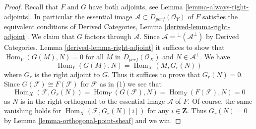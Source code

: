 \documentclass{stacks-project}
\theoremstyle{plain}
\theoremstyle{definition}
\theoremstyle{remark}
\numberwithin{equation}{subsection}
\def\Hom{\mathop{\mathrm{Hom}}\nolimits}
\begin{document}
\begin{proof}
Recall that $F$ and $G$ have both adjoints, see
Lemma \ref{lemma-always-right-adjoints}. In particular
the essential image $\mathcal{A} \subset D_{perf}(\mathcal{O}_Y)$ of $F$
satisfies the equivalent conditions of
Derived Categories, Lemma \ref{derived-lemma-right-adjoint}.
We claim that $G$ factors through $\mathcal{A}$.
Since $\mathcal{A} = {}^\perp(\mathcal{A}^\perp)$ by
Derived Categories, Lemma \ref{derived-lemma-right-adjoint}
it suffices to show that $\Hom_Y(G(M), N) = 0$ for
all $M$ in $D_{perf}(\mathcal{O}_X)$ and $N \in \mathcal{A}^\perp$.
We have
$$
\Hom_Y(G(M), N) = \Hom_X(M, G_r(N))
$$
where $G_r$ is the right adjoint to $G$. Thus it suffices to prove
that $G_r(N) = 0$. Since
$G(\mathcal{F}) \cong F(\mathcal{F})$ for $\mathcal{F}$ as in (1)
we see that
$$
\Hom_X(\mathcal{F}, G_r(N)) =
\Hom_Y(G(\mathcal{F}), N) =
\Hom_Y(F(\mathcal{F}), N) = 0
$$
as $N$ is in the right orthogonal to the essential image $\mathcal{A}$ of $F$.
Of course, the same vanishing holds for $\Hom_X(\mathcal{F}, G_r(N)[i])$
for any $i \in \mathbf{Z}$. Thus $G_r(N) = 0$ by
Lemma \ref{lemma-orthogonal-point-sheaf} and we win.
\end{proof}
\end{document}
